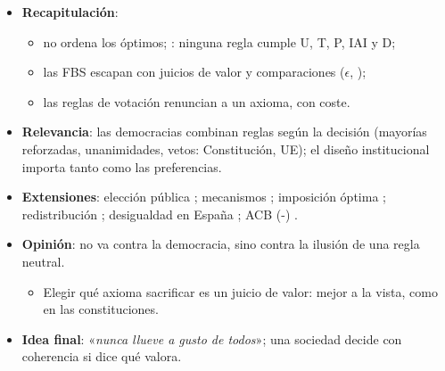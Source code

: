 \documentclass{article}
\begin{document}
\begin{columnas}
\begin{itemize}
\item \textbf{Recapitulación}:
  \begin{itemize}
  \item {} no ordena los óptimos; : ninguna regla cumple U, T, P, IAI y D;
  \item las FBS escapan con juicios de valor y comparaciones ($\epsilon$, );
  \item las reglas de votación renuncian a un axioma, con coste.
  \end{itemize}
\item \textbf{Relevancia}: las democracias combinan reglas según la decisión (mayorías reforzadas, unanimidades, vetos: Constitución, UE); el diseño institucional importa tanto como las preferencias.
\item \textbf{Extensiones}: elección pública ; mecanismos ; imposición óptima ; redistribución ; desigualdad en España ; ACB (-) .
\item \textbf{Opinión}:  no va contra la democracia, sino contra la ilusión de una regla neutral.
  \begin{itemize}
  \item Elegir qué axioma sacrificar es un juicio de valor: mejor a la vista, como en las constituciones.
  \end{itemize}
\item \textbf{Idea final}: «\emph{nunca llueve a gusto de todos}»; una sociedad decide con coherencia si dice qué valora.
\end{itemize}


\end{columnas}
\end{document}
